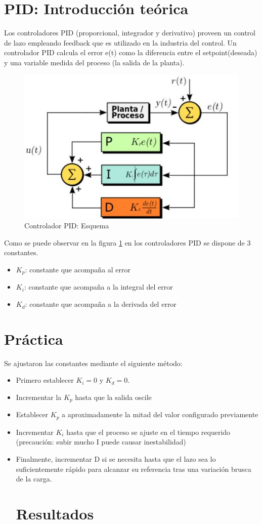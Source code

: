 \documentclass{article}
\begin{document}



\tableofcontents
\newpage

\section{PID: Introducción teórica}
Los controladores PID (proporcional, integrador y derivativo) proveen un control de lazo empleando feedback que es utilizado en la industria del control.
Un controlador PID calcula el error e(t) como la diferencia entre el setpoint(deseada) y una variable medida del proceso (la salida de la planta).


\begin{figure}[H]
\centering
\includegraphics[width=0.5\linewidth]{images/PID.jpg}
\caption{Controlador PID: Esquema}
\label{fig:PID}
\end{figure}

Como se puede observar en la figura \ref{fig:PID} en los controladores PID se dispone de 3 constantes.
\begin{itemize}
  \item $K_p$: constante que acompaña al error 
  \item $K_i$: constante que acompaña a la integral del error 
  \item $K_d$: constante que acompaña a la derivada del error
  
\end{itemize}
\newpage
\section{Práctica}
Se ajustaron las constantes mediante el siguiente método:
\begin{itemize}
  \item Primero establecer $K_i=0$ y $K_d=0$. 
  \item Incrementar la $K_p$ hasta que la salida oscile
  \item Establecer $K_p$ a aproximadamente la mitad del valor configurado previamente
  \item Incrementar $K_i$ hasta que el proceso se ajuste en el tiempo requerido (precaución: subir mucho I puede causar inestabilidad)
  \item Finalmente, incrementar D si se necesita hasta que el lazo sea lo suficientemente rápido para alcanzar su referencia tras una variación brusca de la carga.
 
\newpage
\section{Resultados}
 
  
\end{itemize}
 
\end{document}
